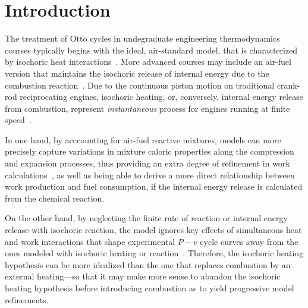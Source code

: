 
\section{Introduction}

    The treatment of  Otto  cycles  in  undegraduate  engineering  thermodynamics  courses  typically  begins  with  the  ideal,
    air-standard  model,  that  is  characterized   by   isochoric   heat   interactions~\cite{2014-CengelYA+BolesMA-McGrawHill,
    2002-MoranMJ+ShapiroHN-LTC, 1985-WylenG-Wiley, 2015-KroosKA+PotterMC-Cengage}. More advanced courses may include an air-fuel
    version    that    maintains    the    isochoric    release    of    internal    energy    due     to     the     combustion
    reaction~\cite{2012-BrunettiF-Blucher}. Due to the continuous piston motion on traditional crank-rod reciprocating  engines,
    isochoric heating, or, conversely, internal energy release  from  combustion,  represent  \emph{instantaneous}  process  for
    engines running at finite speed~\cite{2017-NaaktgeborenC-IntJMechEngEduc}.

    In one hand, by acccounting for air-fuel reactive mixtures, models can more precisely capture variations in mixture  caloric
    properties along  the  compression  and  expansion  processes,  thus  providing  an  extra  degree  of  refinement  in  work
    calculations~\cite{2012-BrunettiF-Blucher}, as well as being  able  to  derive  a  more  direct  relationship  between  work
    production and fuel consumption, if the internal energy release is calculated from the chemical reaction.

    On the other hand, by neglecting the finite rate of reaction or internal energy release with isochoric reaction,  the  model
    ignores key effects of simultaneous heat and work interactions that shape experimental $P-v$ cycle curves away from the ones
    modeled with isochoric heating or reaction~\cite{2013-MartinsJJG-Publindustria}. Therefore, the isochoric heating hypothesis
    can be more idealized than the one that replaces combustion by an external heating---so that  it  may  make  more  sense  to
    abandon the isochoric heating hypothesis before introducing combustion as to yield progressive model refinements.

